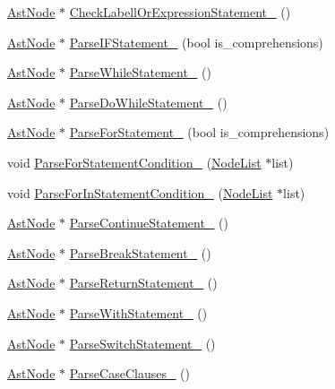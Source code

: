 \begin{DoxyCompactItemize}
\item 
\hyperlink{classmocha_1_1_ast_node}{AstNode} $\ast$ \hyperlink{classmocha_1_1_parser_a0dcf265b77b07a84053fa8b8cc491cf6}{CheckLabellOrExpressionStatement\_\-} ()
\item 
\hyperlink{classmocha_1_1_ast_node}{AstNode} $\ast$ \hyperlink{classmocha_1_1_parser_af5e1b4852a916fa8f60beb8c0debccfd}{ParseIFStatement\_\-} (bool is\_\-comprehensions)
\item 
\hyperlink{classmocha_1_1_ast_node}{AstNode} $\ast$ \hyperlink{classmocha_1_1_parser_abd22d2ae7266faf4a1e9043410cc6cad}{ParseWhileStatement\_\-} ()
\item 
\hyperlink{classmocha_1_1_ast_node}{AstNode} $\ast$ \hyperlink{classmocha_1_1_parser_a73090cd28fb80d75bb42fa873c9c2892}{ParseDoWhileStatement\_\-} ()
\item 
\hyperlink{classmocha_1_1_ast_node}{AstNode} $\ast$ \hyperlink{classmocha_1_1_parser_a3f8763d6bb7dc1a8cea9e73f37952fd6}{ParseForStatement\_\-} (bool is\_\-comprehensions)
\item 
void \hyperlink{classmocha_1_1_parser_ab26e6700d4ea36f16446032e5254ed8e}{ParseForStatementCondition\_\-} (\hyperlink{classmocha_1_1_node_list}{NodeList} $\ast$list)
\item 
void \hyperlink{classmocha_1_1_parser_ad53cf6a9e81f32d71ef0c5508384ec58}{ParseForInStatementCondition\_\-} (\hyperlink{classmocha_1_1_node_list}{NodeList} $\ast$list)
\item 
\hyperlink{classmocha_1_1_ast_node}{AstNode} $\ast$ \hyperlink{classmocha_1_1_parser_a7391900b68771631fcfbb6d21f81d281}{ParseContinueStatement\_\-} ()
\item 
\hyperlink{classmocha_1_1_ast_node}{AstNode} $\ast$ \hyperlink{classmocha_1_1_parser_ac04ef2a55713b2159018bdeb5c83cc5d}{ParseBreakStatement\_\-} ()
\item 
\hyperlink{classmocha_1_1_ast_node}{AstNode} $\ast$ \hyperlink{classmocha_1_1_parser_a3d2b0dda23c713787755bba1aee4d046}{ParseReturnStatement\_\-} ()
\item 
\hyperlink{classmocha_1_1_ast_node}{AstNode} $\ast$ \hyperlink{classmocha_1_1_parser_a252f2eaefe60b333c6106db949300f95}{ParseWithStatement\_\-} ()
\item 
\hyperlink{classmocha_1_1_ast_node}{AstNode} $\ast$ \hyperlink{classmocha_1_1_parser_ae2e9871f038882eb89f1cabb085d7862}{ParseSwitchStatement\_\-} ()
\item 
\hyperlink{classmocha_1_1_ast_node}{AstNode} $\ast$ \hyperlink{classmocha_1_1_parser_a58f0d68ccd7f722c78e8ddcee8299d82}{ParseCaseClauses\_\-} ()

\end{DoxyCompactItemize}

